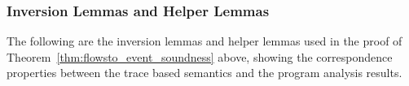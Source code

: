 \subsubsection{Inversion Lemmas and Helper Lemmas}
The following are the inversion lemmas and helper lemmas used in the proof of Theorem~\ref{thm:flowsto_event_soundness} above,
showing the correspondence properties between the trace based semantics and the program analysis results.

